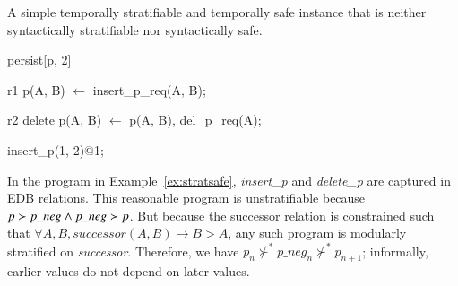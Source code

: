 \begin{example}
\label{ex:stratsafe}
A simple temporally stratifiable and temporally safe \slang instance that is
neither syntactically stratifiable nor syntactically safe.

\begin{Dedalus}
persist[p, 2]  
  
r1
p(A, B) \(\leftarrow\)
  insert\_p\_req(A, B);

r2  
delete p(A, B) \(\leftarrow\)
  p(A, B),
  del\_p\_req(A);

insert\_p(1, 2)@1;
\end{Dedalus}
\end{example}

In the \slang program in Example~\ref{ex:stratsafe}, \emph{insert\_p} and
\emph{delete\_p} are captured in EDB relations.  This reasonable program is
unstratifiable because $p \succ p\_neg \land p\_neg \succ p$.  But because the
successor relation is constrained such that $\forall A,B, successor(A, B)
\rightarrow B > A$, any such program is modularly stratified on
\emph{successor}.  Therefore, we have $p_{n} \not\succ^* p\_neg_{n} \not\succ^*
p_{n+1}$; informally, earlier values do not depend on later values.




